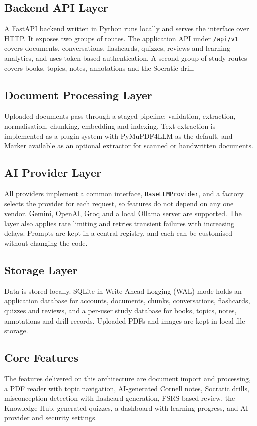 \documentclass[12pt,a4paper]{article}
\newcommand{\code}[1]{\texttt{#1}}
\begin{document}
\subsection{Backend API Layer}
A FastAPI backend written in Python runs locally and serves the interface over HTTP.
It exposes two groups of routes. The application API under \code{/api/v1} covers
documents, conversations, flashcards, quizzes, reviews and learning analytics, and uses
token-based authentication. A second group of study routes covers books, topics, notes,
annotations and the Socratic drill.

\subsection{Document Processing Layer}
Uploaded documents pass through a staged pipeline: validation, extraction,
normalisation, chunking, embedding and indexing. Text extraction is implemented as a
plugin system with PyMuPDF4LLM as the default, and Marker available as an optional
extractor for scanned or handwritten documents.

\subsection{AI Provider Layer}
All providers implement a common interface, \code{BaseLLMProvider}, and a factory selects
the provider for each request, so features do not depend on any one vendor. Gemini,
OpenAI, Groq and a local Ollama server are supported. The layer also applies rate
limiting and retries transient failures with increasing delays. Prompts are kept in a
central registry, and each can be customised without changing the code.

\subsection{Storage Layer}
Data is stored locally. SQLite in Write-Ahead Logging (WAL) mode holds an application
database for accounts, documents, chunks, conversations, flashcards, quizzes and reviews,
and a per-user study database for books, topics, notes, annotations and drill records.
Uploaded PDFs and images are kept in local file storage.

\subsection{Core Features}
The features delivered on this architecture are document import and processing, a PDF
reader with topic navigation, AI-generated Cornell notes, Socratic drills, misconception
detection with flashcard generation, FSRS-based review, the Knowledge Hub, generated
quizzes, a dashboard with learning progress, and AI provider and security settings.
\end{document}
